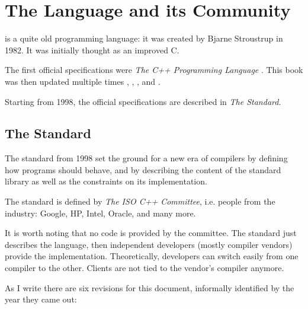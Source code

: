\chapter{The \Cpp{} Language and its Community}

\Cpp is a quite old programming language: it was created by Bjarne
Stroustrup in 1982. It was initially thought as an improved C.

The first official specifications were \emph{The C++ Programming
  Language} \cite{the-cpp-programming-language-1st}. This book was
then updated multiple times \cite{the-cpp-programming-language-2nd},
\cite{the-cpp-programming-language-3rd},
\cite{the-cpp-programming-language-se}, and
\cite{the-cpp-programming-language-4th}.

Starting from 1998, the official specifications are described in
\emph{The Standard}.

\section{The Standard}

The standard from 1998 set the ground for a new era of compilers by
defining how \cpp{} programs should behave, and by describing the
content of the standard library as well as the constraints on its
implementation.

The standard is defined by {\em The ISO C++ Committee}, i.e. people
from the industry: Google, HP, Intel, Oracle, and many more.

It is worth noting that no code is provided by the committee. The
standard just describes the language, then independent developers
(mostly compiler vendors) provide the implementation. Theoretically,
developers can switch easily from one compiler to the other. Clients
are not tied to the vendor's compiler anymore.

As I write there are six revisions for this document, informally
identified by the year they came out:

